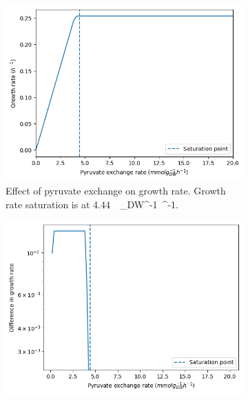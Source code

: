 \begin{figure}
  \begin{subfigure}[t]{0.45\textwidth}
  \centering
    \includegraphics[width=\linewidth]{saturation_pyr}
    \caption{
      Effect of pyruvate exchange on growth rate.
      Growth rate saturation is at \SI{4.44}{\milli\mole~\gram_{DW}^{-1}~\hour^{-1}}.
    }
    \label{fig:model-saturation-pyruvate}
  \end{subfigure}%
  \begin{subfigure}[t]{0.45\textwidth}
  \centering
    \includegraphics[width=\linewidth]{saturation_diff_pyr}
    \caption{
    }
    \label{fig:model-saturation-diff-pyruvate}
  \end{subfigure}


\end{figure}
